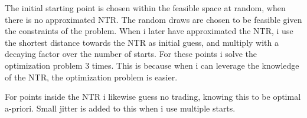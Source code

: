 \documentclass[11pt]{article}
\begin{document}
The initial starting point is chosen within the feasible space at random, when there is no approximated \ac{NTR}.
The random draws are chosen to be feasible given the constraints of the problem.
When i later have approximated the \ac{NTR}, i use the shortest distance towards the \ac{NTR} as initial guess,
and multiply with a decaying factor over the number of starts. For these points i solve the optimization problem $3$ times.
This is because when i can leverage the knowledge of the \ac{NTR}, the optimization problem is easier.

For points inside the \ac{NTR} i likewise guess no trading, knowing this to be optimal a-priori.
Small jitter is added to this when i use multiple starts.



\ifdefined\COMPILINGMAIN
\else
\end{document}
